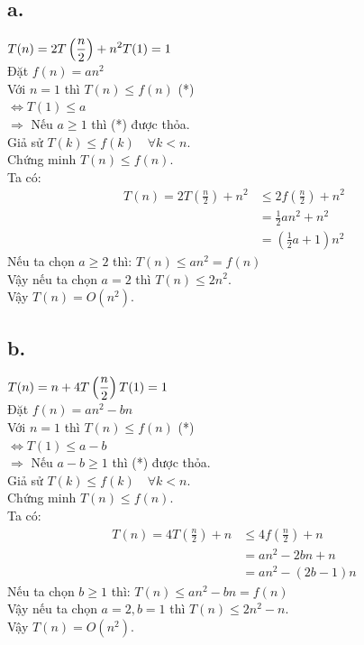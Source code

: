 \documentclass[12pt, a4paper, fleqn]{article}
\begin{document}
		\subsection*{a.}
			$\displaystyle
			T(n) = 2T\left( \frac{n}{2} \right) + n^2\\
			T(1) = 1$\\
			
			Đặt $f(n) = an^2$\\
			Với $n = 1$ thì $T(n) \leq f(n)$ \hspace{100pt} (*)\\
			$\Leftrightarrow  T(1) \leq a$\\
			$\Rightarrow$ Nếu $a\geq 1$ thì (*) được thỏa.\\
			Giả sử $T(k) \leq f(k) \quad \forall k < n$.\\
			Chứng minh $T(n) \leq f(n)$.\\
			Ta có:
			\begin{align*}
				T(n) = 2T\left( \frac{n}{2} \right) + n^2 &\leq 2f\left( \frac{n}{2}\right) + n^2\\
				&= \frac{1}{2} an^2 + n^2\\
				&= \left( \frac{1}{2} a + 1 \right) n^2
			\end{align*}
			Nếu ta chọn $a \geq 2$ thì: $T(n) \leq an^2 = f(n)$\\
			Vậy nếu ta chọn $a = 2$ thì $T(n) \leq 2n^2$.\\
			Vậy $T(n) = O(n^2)$.
		
		\subsection*{b.}
			$\displaystyle
			T(n) = n + 4T\left( \frac{n}{2}\right)\\
			T(1) = 1$\\
			
			Đặt $f(n) = an^2 - bn$\\
			Với $n = 1$ thì $T(n) \leq f(n)$ \hspace{100pt} (*)\\
			$\Leftrightarrow  T(1) \leq a - b$\\
			$\Rightarrow$ Nếu $a - b\geq 1$ thì (*) được thỏa.\\
			Giả sử $T(k) \leq f(k) \quad \forall k < n$.\\
			Chứng minh $T(n) \leq f(n)$.\\
			Ta có:
			\begin{align*}
			T(n) = 4T\left( \frac{n}{2} \right) + n &\leq 4f\left( \frac{n}{2}\right) + n\\
			&= an^2 - 2bn + n\\
			&= an^2 - (2b - 1)n
			\end{align*}
			Nếu ta chọn $b \geq 1$ thì: $T(n) \leq an^2 - bn = f(n)$\\
			Vậy nếu ta chọn $a = 2, b = 1$ thì $T(n) \leq 2n^2 - n$.\\
			Vậy $T(n) = O(n^2)$.
		
\end{document}
